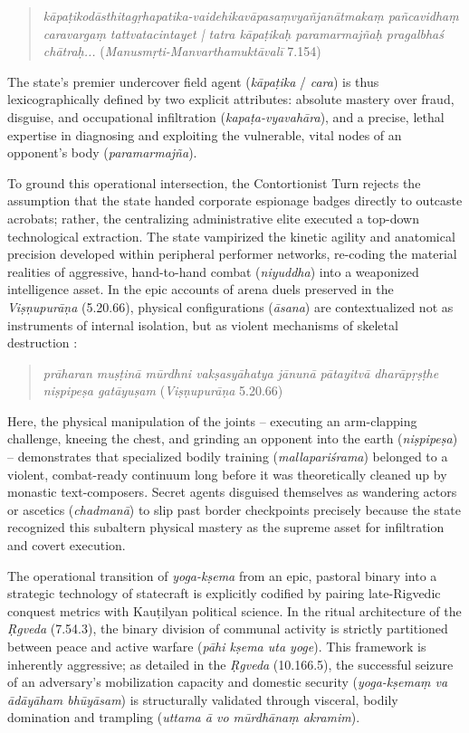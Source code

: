 \documentclass[11pt,twoside,letterpaper]{article}
\begin{document}
\begin{quote}
\textit{kāpaṭikodāsthitagṛhapatika-vaidehikavāpasaṃvyañjanātmakaṃ pañcavidhaṃ caravargaṃ tattvatacintayet | tatra kāpaṭikaḥ paramarmajñaḥ pragalbhaś chātraḥ...} (\textit{Manusmṛti-Manvarthamuktāvalī} 7.154)
\end{quote}

The state’s premier undercover field agent (\textit{kāpaṭika} / \textit{cara}) is thus lexicographically defined by two explicit attributes: absolute mastery over fraud, disguise, and occupational infiltration (\textit{kapaṭa-vyavahāra}), and a precise, lethal expertise in diagnosing and exploiting the vulnerable, vital nodes of an opponent’s body (\textit{paramarmajña}).

To ground this operational intersection, the Contortionist Turn rejects the assumption that the state handed corporate espionage badges directly to outcaste acrobats; rather, the centralizing administrative elite executed a top-down technological extraction. The state vampirized the kinetic agility and anatomical precision developed within peripheral performer networks, re-coding the material realities of aggressive, hand-to-hand combat (\textit{niyuddha}) into a weaponized intelligence asset. In the epic accounts of arena duels preserved in the \textit{Viṣṇupurāṇa} (5.20.66), physical configurations (\textit{āsana}) are contextualized not as instruments of internal isolation, but as violent mechanisms of skeletal destruction \citep{ViP_5}:

\begin{quote}
\textit{prāharan muṣṭinā mūrdhni vakṣasyāhatya jānunā pātayitvā dharāpṛṣṭhe niṣpipeṣa gatāyuṣam} (\textit{Viṣṇupurāṇa} 5.20.66)
\end{quote}

Here, the physical manipulation of the joints – executing an arm-clapping challenge, kneeing the chest, and grinding an opponent into the earth (\textit{niṣpipeṣa}) – demonstrates that specialized bodily training (\textit{mallapariśrama}) belonged to a violent, combat-ready continuum long before it was theoretically cleaned up by monastic text-composers. Secret agents disguised themselves as wandering actors or ascetics (\textit{chadmanā}) to slip past border checkpoints precisely because the state recognized this subaltern physical mastery as the supreme asset for infiltration and covert execution.

The operational transition of \textit{yoga-kṣema} from an epic, pastoral binary into a strategic technology of statecraft is explicitly codified by pairing late-Rigvedic conquest metrics with Kauṭilyan political science. In the ritual architecture of the \textit{Ṛgveda} (7.54.3), the binary division of communal activity is strictly partitioned between peace and active warfare (\textit{pāhi kṣema uta yoge}). This framework is inherently aggressive; as detailed in the \textit{Ṛgveda} (10.166.5), the successful seizure of an adversary’s mobilization capacity and domestic security (\textit{yoga-kṣemaṃ va ādāyāham bhūyāsam}) is structurally validated through visceral, bodily domination and trampling (\textit{uttama ā vo mūrdhānaṃ akramim}). 
\end{document}
